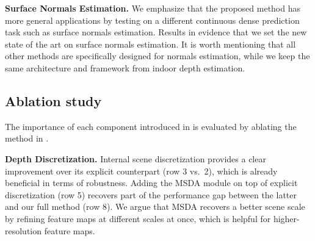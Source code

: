 \noindent{}\textbf{Surface Normals Estimation.} We emphasize that the proposed method has more general applications by testing \ourmodel on a different continuous dense prediction task such as surface normals estimation. Results in  evidence that we set the new state of the art on surface normals estimation. It is worth mentioning that all other methods are specifically designed for normals estimation, while we keep the same architecture and framework from indoor depth estimation.
\begin{table}[]
    \centering
    \caption{\textbf{Comparison of surface normals estimation methods on NYU official test set.} \ourmodel architecture and training pipeline is the same as the one utilized for indoor depth estimation.}
    \vspace{-10pt}
    \label{tab:nyu_normals_res}
    \vspace{-10pt}
\end{table}

\subsection{Ablation study}
\label{sec:experiments_ablations}
The importance of each component introduced in \ourmodel is evaluated by ablating the method in . 

\noindent{}\textbf{Depth Discretization.} Internal scene discretization provides a clear improvement over its explicit counterpart (row 3 vs.\ 2), which is already beneficial in terms of robustness. Adding the MSDA module on top of explicit discretization (row 5) recovers part of the performance gap between the latter and our full method (row 8). We argue that MSDA recovers a better scene scale by refining feature maps at different scales at once, which is helpful for higher-resolution feature maps.

